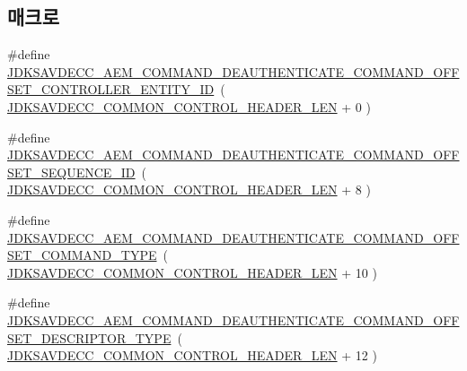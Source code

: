 \subsection*{매크로}
\begin{DoxyCompactItemize}
\item 
\#define \hyperlink{group__command__deauthenticate_ga24d9d5ec78e727c0194d110b4c5e743a}{J\+D\+K\+S\+A\+V\+D\+E\+C\+C\+\_\+\+A\+E\+M\+\_\+\+C\+O\+M\+M\+A\+N\+D\+\_\+\+D\+E\+A\+U\+T\+H\+E\+N\+T\+I\+C\+A\+T\+E\+\_\+\+C\+O\+M\+M\+A\+N\+D\+\_\+\+O\+F\+F\+S\+E\+T\+\_\+\+C\+O\+N\+T\+R\+O\+L\+L\+E\+R\+\_\+\+E\+N\+T\+I\+T\+Y\+\_\+\+ID}~( \hyperlink{group__jdksavdecc__avtp__common__control__header_gaae84052886fb1bb42f3bc5f85b741dff}{J\+D\+K\+S\+A\+V\+D\+E\+C\+C\+\_\+\+C\+O\+M\+M\+O\+N\+\_\+\+C\+O\+N\+T\+R\+O\+L\+\_\+\+H\+E\+A\+D\+E\+R\+\_\+\+L\+EN} + 0 )
\item 
\#define \hyperlink{group__command__deauthenticate_gabc954dd2bcfbc8fd55318573a42987dc}{J\+D\+K\+S\+A\+V\+D\+E\+C\+C\+\_\+\+A\+E\+M\+\_\+\+C\+O\+M\+M\+A\+N\+D\+\_\+\+D\+E\+A\+U\+T\+H\+E\+N\+T\+I\+C\+A\+T\+E\+\_\+\+C\+O\+M\+M\+A\+N\+D\+\_\+\+O\+F\+F\+S\+E\+T\+\_\+\+S\+E\+Q\+U\+E\+N\+C\+E\+\_\+\+ID}~( \hyperlink{group__jdksavdecc__avtp__common__control__header_gaae84052886fb1bb42f3bc5f85b741dff}{J\+D\+K\+S\+A\+V\+D\+E\+C\+C\+\_\+\+C\+O\+M\+M\+O\+N\+\_\+\+C\+O\+N\+T\+R\+O\+L\+\_\+\+H\+E\+A\+D\+E\+R\+\_\+\+L\+EN} + 8 )
\item 
\#define \hyperlink{group__command__deauthenticate_ga00e3d24e3b3ea12f99a8e431933ec081}{J\+D\+K\+S\+A\+V\+D\+E\+C\+C\+\_\+\+A\+E\+M\+\_\+\+C\+O\+M\+M\+A\+N\+D\+\_\+\+D\+E\+A\+U\+T\+H\+E\+N\+T\+I\+C\+A\+T\+E\+\_\+\+C\+O\+M\+M\+A\+N\+D\+\_\+\+O\+F\+F\+S\+E\+T\+\_\+\+C\+O\+M\+M\+A\+N\+D\+\_\+\+T\+Y\+PE}~( \hyperlink{group__jdksavdecc__avtp__common__control__header_gaae84052886fb1bb42f3bc5f85b741dff}{J\+D\+K\+S\+A\+V\+D\+E\+C\+C\+\_\+\+C\+O\+M\+M\+O\+N\+\_\+\+C\+O\+N\+T\+R\+O\+L\+\_\+\+H\+E\+A\+D\+E\+R\+\_\+\+L\+EN} + 10 )
\item 
\#define \hyperlink{group__command__deauthenticate_ga40e437a448eab318b5db1005a69df070}{J\+D\+K\+S\+A\+V\+D\+E\+C\+C\+\_\+\+A\+E\+M\+\_\+\+C\+O\+M\+M\+A\+N\+D\+\_\+\+D\+E\+A\+U\+T\+H\+E\+N\+T\+I\+C\+A\+T\+E\+\_\+\+C\+O\+M\+M\+A\+N\+D\+\_\+\+O\+F\+F\+S\+E\+T\+\_\+\+D\+E\+S\+C\+R\+I\+P\+T\+O\+R\+\_\+\+T\+Y\+PE}~( \hyperlink{group__jdksavdecc__avtp__common__control__header_gaae84052886fb1bb42f3bc5f85b741dff}{J\+D\+K\+S\+A\+V\+D\+E\+C\+C\+\_\+\+C\+O\+M\+M\+O\+N\+\_\+\+C\+O\+N\+T\+R\+O\+L\+\_\+\+H\+E\+A\+D\+E\+R\+\_\+\+L\+EN} + 12 )
\item 

\end{DoxyCompactItemize}
